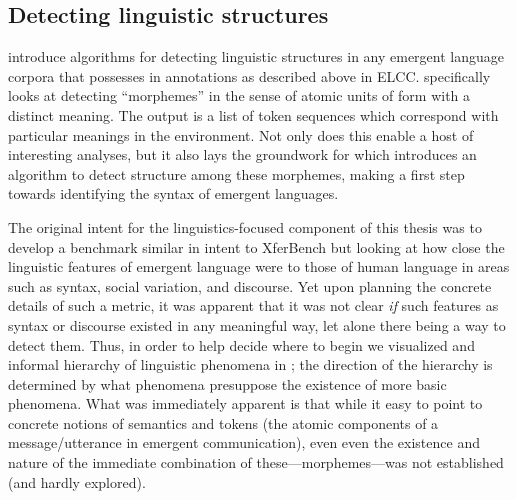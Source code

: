 \subsection{Detecting linguistic structures}

 introduce algorithms for detecting linguistic structures in any emergent language corpora that possesses in annotations as described above in ELCC.\@
{} specifically looks at detecting ``morphemes'' in the sense of atomic units of form with a distinct meaning.
The output is a list of token sequences which correspond with particular meanings in the environment.
Not only does this enable a host of interesting analyses, but it also lays the groundwork for  which introduces an algorithm to detect structure among these morphemes, making a first step towards identifying the syntax of emergent languages.

The original intent for the linguistics-focused component of this thesis was to develop a benchmark similar in intent to XferBench but looking at how close the linguistic features of emergent language were to those of human language in areas such as syntax, social variation, and discourse.
Yet upon planning the concrete details of such a metric, it was apparent that it was not clear \emph{if} such features as syntax or discourse existed in any meaningful way, let alone there being a way to detect them.
Thus, in order to help decide where to begin we visualized and informal hierarchy of linguistic phenomena in ; the direction of the hierarchy is determined by what phenomena presuppose the existence of more basic phenomena.
What was immediately apparent is that while it easy to point to concrete notions of semantics and tokens (the atomic components of a message/utterance in emergent communication), even even the existence and nature of the immediate combination of these---morphemes---was not established (and hardly explored).

